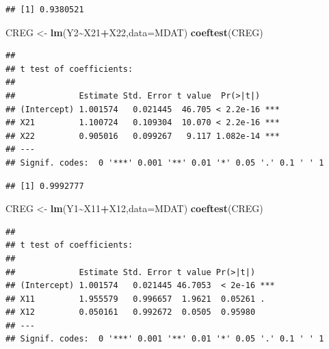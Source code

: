 \documentclass[
]{book}
\newenvironment{Shaded}{\begin{snugshade}}{\end{snugshade}}
\newcommand{\AttributeTok}[1]{\textcolor[rgb]{0.13,0.29,0.53}{#1}}
\newcommand{\CommentTok}[1]{\textcolor[rgb]{0.56,0.35,0.01}{\textit{#1}}}
\newcommand{\FunctionTok}[1]{\textcolor[rgb]{0.13,0.29,0.53}{\textbf{#1}}}
\newcommand{\NormalTok}[1]{#1}
\newcommand{\OtherTok}[1]{\textcolor[rgb]{0.56,0.35,0.01}{#1}}
\newcommand{\SpecialCharTok}[1]{\textcolor[rgb]{0.81,0.36,0.00}{\textbf{#1}}}
\begin{document}
\begin{verbatim}
## [1] 0.9380521
\end{verbatim}

\begin{Shaded}
\begin{Highlighting}[]
\NormalTok{CREG }\OtherTok{\textless{}{-}} \FunctionTok{lm}\NormalTok{(Y2}\SpecialCharTok{\textasciitilde{}}\NormalTok{X21}\SpecialCharTok{+}\NormalTok{X22,}\AttributeTok{data=}\NormalTok{MDAT)}
\FunctionTok{coeftest}\NormalTok{(CREG)}
\end{Highlighting}
\end{Shaded}

\begin{verbatim}
## 
## t test of coefficients:
## 
##             Estimate Std. Error t value  Pr(>|t|)    
## (Intercept) 1.001574   0.021445  46.705 < 2.2e-16 ***
## X21         1.100724   0.109304  10.070 < 2.2e-16 ***
## X22         0.905016   0.099267   9.117 1.082e-14 ***
## ---
## Signif. codes:  0 '***' 0.001 '**' 0.01 '*' 0.05 '.' 0.1 ' ' 1
\end{verbatim}

\begin{Shaded}
\end{Shaded}

\begin{verbatim}
## [1] 0.9992777
\end{verbatim}

\begin{Shaded}
\begin{Highlighting}[]
\NormalTok{CREG }\OtherTok{\textless{}{-}} \FunctionTok{lm}\NormalTok{(Y1}\SpecialCharTok{\textasciitilde{}}\NormalTok{X11}\SpecialCharTok{+}\NormalTok{X12,}\AttributeTok{data=}\NormalTok{MDAT)}
\FunctionTok{coeftest}\NormalTok{(CREG)}
\end{Highlighting}
\end{Shaded}

\begin{verbatim}
## 
## t test of coefficients:
## 
##             Estimate Std. Error t value Pr(>|t|)    
## (Intercept) 1.001574   0.021445 46.7053  < 2e-16 ***
## X11         1.955579   0.996657  1.9621  0.05261 .  
## X12         0.050161   0.992672  0.0505  0.95980    
## ---
## Signif. codes:  0 '***' 0.001 '**' 0.01 '*' 0.05 '.' 0.1 ' ' 1
\end{verbatim}
\end{document}
